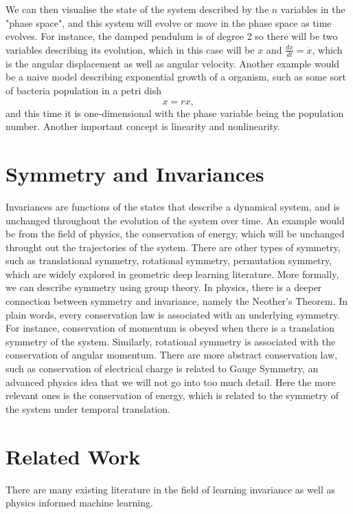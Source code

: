 \documentclass{statsmsc}
\begin{document}
We can then visualise the state of the system described by the $n$ variables in the "phase space", and this system will evolve or move in the phase space as time evolves. 
For instance, the damped pendulum is of degree 2 so there will be two variables describing its evolution, which in this case will be $x$ and $\frac{dx}{dt}=\dot{x}$, which is the angular displacement as well as angular velocity.
Another example would be a naive model describing exponential growth of a organism, such as some sort of bacteria population in a petri dish
$$
\dot{x}=rx,
$$
and this time it is one-dimensional with the phase variable being the population number.
Another important concept is linearity and nonlinearity. 


\section{Symmetry and Invariances}
Invariances are functions of the states that describe a dynamical system, and is unchanged throughout the evolution of the system over time. 
An example would be from the field of physics, the conservation of energy, which will be unchanged throught out the trajectories of the system.
There are other types of symmetry, such as translational symmetry, rotational symmetry, permutation symmetry, which are widely explored in geometric deep learning literature. 
More formally, we can describe symmetry using group theory.
In physics, there is a deeper connection between symmetry and invariance, namely the Neother's Theorem.
In plain words, every conservation law is associated with an underlying symmetry.
For instance, conservation of momentum is obeyed when there is a translation symmetry of the system. 
Similarly, rotational symmetry is associated with the conservation of angular momentum.
There are more abstract conservation law, such as conservation of electrical charge is related to Gauge Symmetry, an advanced physics idea that we will not go into too much detail. 
Here the more relevant ones is the conservation of energy, which is related to the symmetry of the system under temporal translation.


\section{Related Work}
There are many existing literature in the field of learning invariance as well as physics informed machine learning.
\end{document}
